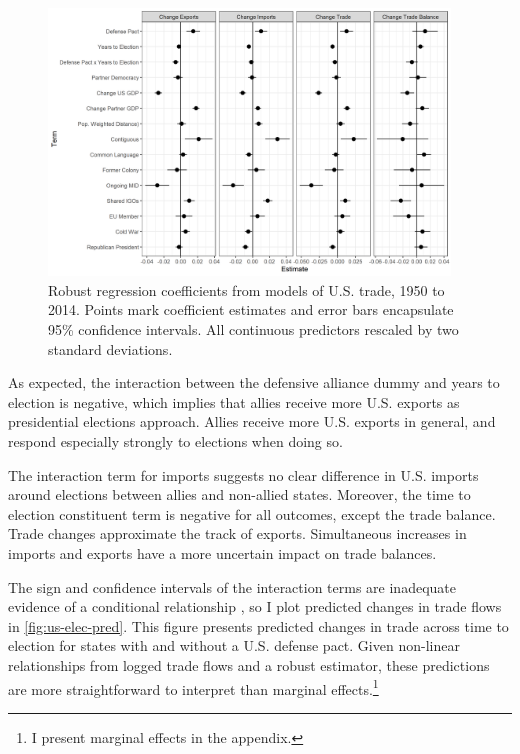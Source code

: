 \documentclass[12pt]{article}
\begin{document}
\begin{figure}
\centering
\includegraphics[width=0.95\textwidth]{../figures/us-trade-coefs.png}
\caption{Robust regression coefficients from models of U.S. trade, 1950 to 2014. Points mark coefficient estimates and error bars encapsulate 95\% confidence intervals. All continuous predictors rescaled by two standard deviations.}
\label{fig:us-trade-coefs}
\end{figure}


As expected, the interaction between the defensive alliance dummy and years to election is negative, which implies that allies receive more U.S. exports as presidential elections approach.
Allies receive more U.S. exports in general, and respond especially strongly to elections when doing so.


The interaction term for imports suggests no clear difference in U.S. imports around elections between allies and non-allied states. 
Moreover, the time to election constituent term is negative for all outcomes, except the trade balance. 
Trade changes approximate the track of exports. 
Simultaneous increases in imports and exports have a more uncertain impact on trade balances.
 


The sign and confidence intervals of the interaction terms are inadequate evidence of a conditional relationship \citep{BramborClarkGolder2006}, so I plot predicted changes in trade flows in \autoref{fig:us-elec-pred}.
This figure presents predicted changes in trade across time to election for states with and without a U.S. defense pact. 
Given non-linear relationships from logged trade flows and a robust estimator, these predictions are more straightforward to interpret than marginal effects.\footnote{I present marginal effects in the appendix.} 
\end{document}

